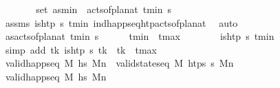 \begin{isabellebody}
\ \ \ \ \isamarkupfalse%
\ \isamarkupfalse%
\ {\isachardoublequoteopen}set\ as\isactrlsub m\isactrlsub i\isactrlsub n\ {\isacharequal}{\kern0pt}\ acts{\isacharunderscore}{\kern0pt}of{\isacharunderscore}{\kern0pt}plan{\isacharunderscore}{\kern0pt}at\ t\isactrlsub m\isactrlsub i\isactrlsub n\ {\isasympi}s{\isachardoublequoteclose}\isanewline
\ \ \ \ \ \ \isamarkupfalse%
\ assms\ {\isacartoucheopen}is{\isacharunderscore}{\kern0pt}htp\ {\isasympi}s\ t\isactrlsub m\isactrlsub i\isactrlsub n{\isacartoucheclose}\ ind{\isacharunderscore}{\kern0pt}happ{\isacharunderscore}{\kern0pt}seq{\isacharunderscore}{\kern0pt}htp{\isacharunderscore}{\kern0pt}acts{\isacharunderscore}{\kern0pt}of{\isacharunderscore}{\kern0pt}plan{\isacharunderscore}{\kern0pt}at\ \isamarkupfalse%
\ auto\isanewline
\ \ \ \ \isamarkupfalse%
\ {\isacharquery}{\kern0pt}as{\isacharequal}{\kern0pt}{\isachardoublequoteopen}acts{\isacharunderscore}{\kern0pt}of{\isacharunderscore}{\kern0pt}plan{\isacharunderscore}{\kern0pt}at\ t\isactrlsub m\isactrlsub i\isactrlsub n\ {\isasympi}s{\isachardoublequoteclose}\isanewline
\isanewline
\ \ \ \ \isamarkupfalse%
\ {\isachardoublequoteopen}t\isactrlsub m\isactrlsub i\isactrlsub n\ {\isasymle}\ t\isactrlsub m\isactrlsub a\isactrlsub x{\isachardoublequoteclose}\isanewline
\ \ \ \ \ \ \isamarkupfalse%
\ {\isacartoucheopen}is{\isacharunderscore}{\kern0pt}htp\ {\isasympi}s\ t\isactrlsub m\isactrlsub i\isactrlsub n{\isacartoucheclose}\ \isamarkupfalse%
\ {\isacharparenleft}{\kern0pt}simp\ add{\isacharcolon}{\kern0pt}\ {\isacartoucheopen}{\isasymforall}t\isactrlsub k{\isachardot}{\kern0pt}\ is{\isacharunderscore}{\kern0pt}htp\ {\isasympi}s\ t\isactrlsub k\ {\isasymlongrightarrow}\ t\isactrlsub k\ {\isasymle}\ t\isactrlsub m\isactrlsub a\isactrlsub x{\isacartoucheclose}{\isacharparenright}{\kern0pt}\isanewline
\isanewline
\ \ \ \ \isamarkupfalse%
\ {\isachardoublequoteopen}valid{\isacharunderscore}{\kern0pt}happ{\isacharunderscore}{\kern0pt}seq\ M\ hs\ M\isactrlsub n\ {\isasymlongleftrightarrow}\ valid{\isacharunderscore}{\kern0pt}state{\isacharunderscore}{\kern0pt}seq\ M\ htps\ {\isasympi}s\ M\isactrlsub n{\isachardoublequoteclose}\isanewline
\ \ \ \ \isamarkupfalse%
\isanewline
\ \ \ \ \ \ \isamarkupfalse%
\ {\isachardoublequoteopen}valid{\isacharunderscore}{\kern0pt}happ{\isacharunderscore}{\kern0pt}seq\ M\ hs\ M\isactrlsub n{\isachardoublequoteclose}%

\end{isabellebody}

